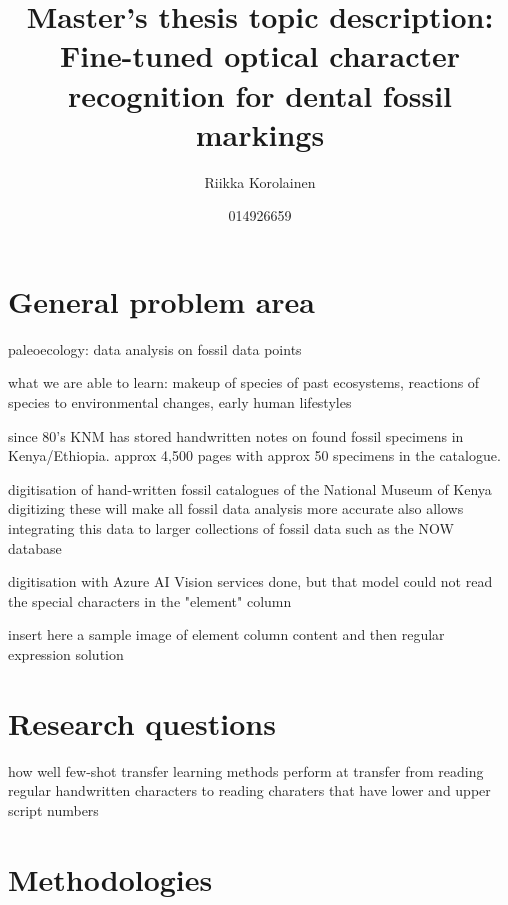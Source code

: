 \documentclass{article}
\title{Master's thesis topic description: Fine-tuned optical character recognition for dental fossil markings}
\author{Riikka Korolainen}
\date{014926659}
\begin{document}
\maketitle

\section{General problem area}

paleoecology: data analysis on fossil data points

what we are able to learn: makeup of species of past ecosystems, reactions
of species to environmental changes, early human lifestyles \cite{Žliobaitė2023}

since 80's KNM has stored handwritten notes on found fossil specimens in 
Kenya/Ethiopia. approx 4,500 pages with approx 50 specimens in the catalogue. 

digitisation of hand-written fossil catalogues of the National Museum of Kenya
digitizing these will make all fossil data analysis more accurate
also allows integrating this data to larger collections of fossil data such as the NOW database \cite{Žliobaitė2023}

digitisation with Azure AI Vision services done, but that model could 
not read the special characters in the "element" column

insert here a sample image of element column content and then
regular expression solution

\section{Research questions}

how well few-shot transfer learning methods perform at transfer from reading 
regular handwritten characters to reading charaters that have lower and 
upper script numbers


\section{Methodologies}


\end{document}
